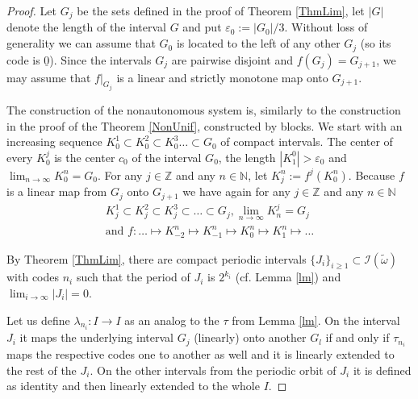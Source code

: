 \documentclass{amsart}
\begin{document}
\begin{proof}
Let $G_j$ be the sets defined in the proof of Theorem \ref{ThmLim}, let $|G|$ denote the length of the interval $G$ and put $\varepsilon_0 := |G_0|/3$. Without loss of generality we can assume that $G_0$ is located to the left of any other $G_j$ (so its code is $\underline{0}$). Since the intervals $G_j$ are pairwise disjoint and $f(G_j) = G_{j+1}$, we may assume that $f|_{G_j}$ is a linear and strictly monotone map onto $G_{j+1}$.

The construction of the nonautonomous system is, similarly to the construction in the proof of the Theorem \ref{NonUnif}, constructed by blocks. We start with an increasing sequence $K^1_0 \subset K^2_0 \subset K^3_0 \ldots \subset G_0$ of compact intervals. The center of every $K^j_0$ is the center $c_0$ of the interval $G_0$, the length $|K^0_1| > \varepsilon_0$ and $\lim_{n\rightarrow\infty} K^n_0 = G_0$. For any $j\in\mathbb{Z}$ and any $n\in\mathbb{N}$, let $K^n_j := f^j(K^n_0)$. Because $f$ is a linear map from $G_j$ onto $G_{j+1}$ we have again for any $j\in\mathbb{Z}$ and any $n\in\mathbb{N}$
\begin{multline*}
K^1_j \subset K^2_j \subset K^3_j \subset \ldots \subset G_j, \lim_{n\rightarrow\infty} K^j_n = G_j\\ \mbox{and } f\!:\ldots \mapsto K^n_{-2} \mapsto K^n_{-1} \mapsto K^n_0 \mapsto K^n_1 \mapsto \ldots
\end{multline*}

By Theorem \ref{ThmLim}, there are compact periodic intervals $\{J_i\}_{i\geq 1} \subset \mathcal{I}(\tilde{\omega})$ with codes $n_i$ such that the period of $J_i$ is $2^{k_i}$ (cf. Lemma \ref{lm}) and $\lim_{i\rightarrow\infty} |J_i| = 0$.

Let us define $\lambda_{n_i}: I\rightarrow I$ as an analog to the $\tau$ from Lemma \ref{lm}. On the interval $J_i$ it maps the underlying interval $G_j$ (linearly) onto another $G_l$ if and only if $\tau_{n_i}$ maps the respective codes one to another as well and it is linearly extended to the rest of the $J_i$. On the other intervals from the periodic orbit of $J_i$ it is defined as identity and then linearly extended to the whole $I$.


\end{proof}
\end{document}

